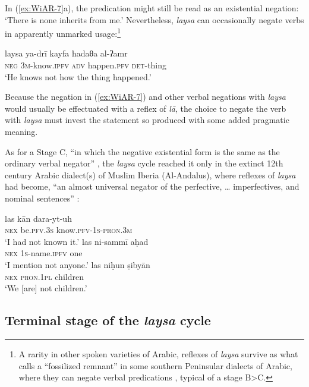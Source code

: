 \documentclass[output=paper]{langsci/langscibook}
\begin{document}
In (\ref{ex:WiAR-7}a), the predication might still be read as an existential negation: ‘There is none inherits from me.’ Nevertheless, \textit{laysa} can occasionally negate verbs in apparently unmarked usage:\footnote{A rarity in other spoken varieties of Arabic, reflexes of \textit{laysa} survive as what \citet[26]{holes2006a} calls a “fossilized remnant” in some southern Peninsular dialects of Arabic, where they can negate verbal predications \citep[142--144]{al-azraqi1998a}, typical of a stage B>C.}

\ea \label{ex:WiAR-8}
	\gll laysa ya-drī kayfa ħadaθa al-ʔamr \\
	\textsc{neg} \textsc{3m}-know.\textsc{ipfv} \textsc{adv} happen.\textsc{pfv} \textsc{det}-thing\\
	\glt ‘He knows not how the thing happened.’ \citep[28]{kanafani2006a}
\z

Because the negation in (\ref{ex:WiAR-7}) and other verbal negations with \textit{laysa} would usually be effectuated with a reflex of \textit{lā}, the choice to negate the verb with \textit{laysa} must invest the statement so produced with some added pragmatic meaning.

As for a Stage C, “in which the negative existential form is the same as the ordinary verbal negator” \citep[11]{Croft1991}, the \textit{laysa} cycle reached it only in the extinct 12th century Arabic dialect(s) of Muslim Iberia (Al-Andalus), where reflexes of \textit{laysa} had become, “an almost universal negator of the perfective, … imperfectives, and nominal sentences” \citep{corriente2013a}:

\ea \label{ex:WiAR-9}
  \ea
  	\gll las kān dara-yt-uh\\
  	\textsc{nex} be.\textsc{pfv.3s} know.\textsc{pfv-1s-pron.3m}\\
  	\glt ‘I had not known it.’ \citep[126]{corriente2013a}
  \ex
  	\gll las ni-sammī aḥad\\
  	\textsc{nex} \textsc{1s}-name.\textsc{ipfv} one\\
    \glt ‘I mention not anyone.’ \citep[126]{corriente2013a}
  \ex
  	\gll las niḥun ṣibyān\\
  	\textsc{nex} \textsc{pron.1pl} children\\
  	\glt ‘We [are] not children.’ \citep[126]{corriente2013a}
\z \z

\subsection{Terminal stage of the \textit{laysa} cycle} \label{s:WiAR-2.4}
\end{document}
